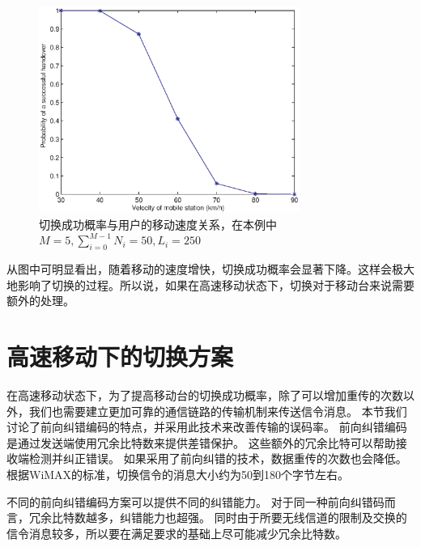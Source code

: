 \begin{figure}[t]
\begin{centering}
\includegraphics[height=6.75cm]{iccs_speed_prob_theroy}
\caption{切换成功概率与用户的移动速度关系，在本例中$M=5, \sum_{i=0}^{M-1}N_i=50, L_i=250$}
\label{fig:chap_iccs_handover_algorithm_Pro_V}
\end{centering}
\end{figure}

从图中可明显看出，随着移动的速度增快，切换成功概率会显著下降。这样会极大地影响了切换的过程。所以说，如果在高速移动状态下，切换对于移动台来说需要额外的处理。

\section{高速移动下的切换方案}
在高速移动状态下，为了提高移动台的切换成功概率，除了可以增加重传的次数以外，我们也需要建立更加可靠的通信链路的传输机制来传送信令消息。
本节我们讨论了前向纠错编码的特点，并采用此技术来改善传输的误码率。
前向纠错编码是通过发送端使用冗余比特数来提供差错保护。
这些额外的冗余比特可以帮助接收端检测并纠正错误。
如果采用了前向纠错的技术，数据重传的次数也会降低。
根据WiMAX的标准，切换信令的消息大小约为50到180个字节左右。

不同的前向纠错编码方案可以提供不同的纠错能力。
对于同一种前向纠错码而言，冗余比特数越多，纠错能力也超强。
同时由于所要无线信道的限制及交换的信令消息较多，所以要在满足要求的基础上尽可能减少冗余比特数。

